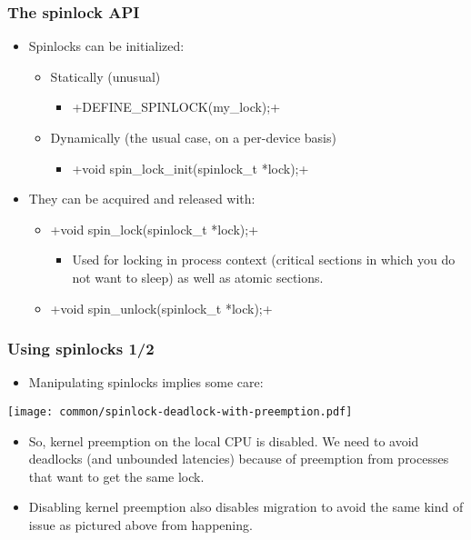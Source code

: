 \begin{frame}[fragile]\frametitle{The spinlock API}
  \begin{itemize}
  \item Spinlocks can be initialized:
    \begin{itemize}
    \item Statically (unusual)
      \begin{itemize}
      \item {}+DEFINE_SPINLOCK(my_lock);+
      \end{itemize}
    \item Dynamically (the usual case, on a per-device basis)
      \begin{itemize}
      \item {}+void spin_lock_init(spinlock_t *lock);+
      \end{itemize}
    \end{itemize}
  \item They can be acquired and released with:
    \begin{itemize}
    \item {}+void spin_lock(spinlock_t *lock);+
      \begin{itemize}
      \item Used for locking in process context (critical sections
        in which you do not want to sleep) as well as atomic
        sections.
      \end{itemize}
    \item {}+void spin_unlock(spinlock_t *lock);+
    \end{itemize}
  \end{itemize}
\end{frame}

\begin{frame}[fragile]\frametitle{Using spinlocks 1/2}
  \begin{itemize}
  \item Manipulating spinlocks implies some care:
  \end{itemize}
  \texttt{[image: common/spinlock-deadlock-with-preemption.pdf]}
  \begin{itemize}
  \item So, kernel preemption on the local CPU is disabled. We need
    to avoid deadlocks (and unbounded latencies) because of preemption
    from processes that want to get the same lock.
  \item Disabling kernel preemption also disables migration to avoid
    the same kind of issue as pictured above from happening.
  \end{itemize}
\end{frame}

